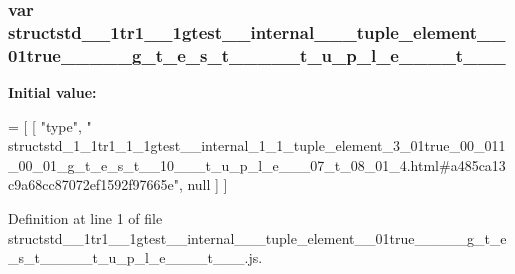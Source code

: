 \subsubsection[{\texorpdfstring{structstd\+\_\+1\+\_\+1tr1\+\_\+1\+\_\+1gtest\+\_\+\+\_\+internal\+\_\+1\+\_\+1\+\_\+tuple\+\_\+element\+\_\+3\+\_\+01true\+\_\+00\+\_\+011\+\_\+00\+\_\+01\+\_\+g\+\_\+t\+\_\+e\+\_\+s\+\_\+t\+\_\+\+\_\+10\+\_\+\+\_\+\+\_\+t\+\_\+u\+\_\+p\+\_\+l\+\_\+e\+\_\+\+\_\+\+\_\+07\+\_\+t\+\_\+08\+\_\+01\+\_\+4}{structstd_1_1tr1_1_1gtest__internal_1_1_tuple_element_3_01true_00_011_00_01_g_t_e_s_t__10___t_u_p_l_e___07_t_08_01_4}}]{\setlength{\rightskip}{0pt plus 5cm}var structstd\+\_\+\_\+1tr1\+\_\+\_\+1gtest\+\_\+\+\_\+internal\+\_\+\_\+\_\+tuple\+\_\+element\+\_\+\_\+01true\+\_\+\_\+\_\+\_\+\_\+g\+\_\+t\+\_\+e\+\_\+s\+\_\+t\+\_\+\+\_\+\_\+\+\_\+\+\_\+t\+\_\+u\+\_\+p\+\_\+l\+\_\+e\+\_\+\+\_\+\+\_\+\_\+t\+\_\+\_\+\_}\hypertarget{structstd__1__1tr1__1__1gtest____internal__1__1__tuple__element__3__01true__00__011__00__01__g__456b19882b59bd01974759219b11fcb8_a2dcef2bcbe660bee21e714bd797190c9}{}\label{structstd__1__1tr1__1__1gtest____internal__1__1__tuple__element__3__01true__00__011__00__01__g__456b19882b59bd01974759219b11fcb8_a2dcef2bcbe660bee21e714bd797190c9}
{\bfseries Initial value\+:}
\begin{DoxyCode}
=
[
    [ \textcolor{stringliteral}{"type"}, \textcolor{stringliteral}{"
      structstd\_1\_1tr1\_1\_1gtest\_\_internal\_1\_1\_tuple\_element\_3\_01true\_00\_011\_00\_01\_g\_t\_e\_s\_t\_\_10\_\_\_t\_u\_p\_l\_e\_\_\_07\_t\_08\_01\_4.html#a485ca13c9a68cc87072ef1592f97665e"}, null ]
]
\end{DoxyCode}


Definition at line 1 of file structstd\+\_\+\_\+1tr1\+\_\+\_\+1gtest\+\_\+\+\_\+internal\+\_\+\_\+\_\+tuple\+\_\+element\+\_\+\_\+01true\+\_\+\_\+\_\+\_\+\_\+g\+\_\+t\+\_\+e\+\_\+s\+\_\+t\+\_\+\+\_\+\_\+\+\_\+\+\_\+t\+\_\+u\+\_\+p\+\_\+l\+\_\+e\+\_\+\+\_\+\+\_\+\_\+t\+\_\+\_\+\_.\+js.

